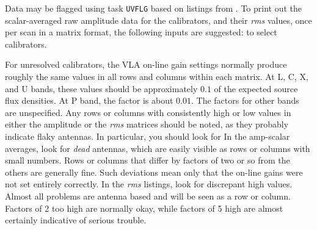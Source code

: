       Data may be flagged using task {\tt UVFLG} based on
listings from \hbox{{\tt {}}}.  To print out the
scalar-averaged raw amplitude data for the calibrators, and their {\it
rms\/} values, once per scan in a matrix format, the following inputs
are suggested:
 {to select calibrators.}

      For unresolved calibrators, the VLA on-line gain settings
normally produce roughly the same values in all rows and columns
within each matrix.  At L, C, X, and U bands, these values should be
approximately $0.1$ of the expected source flux densities.  At P band,
the factor is about $0.01$.  The factors for other bands are
unspecified.  Any rows or columns with consistently high or low values
in either the amplitude or the {\it rms\/}  matrices should be noted,
as they probably indicate flaky antennas.  In particular, you should
look for
\xbit
\Item In the amp-scalar averages, look for {\it dead\/} antennas,
     which are easily visible as rows or columns with small numbers.
     Rows or columns that differ by factors of two or so from the
     others are generally fine.  Such deviations mean only that the
     on-line gains were not set entirely correctly.
\Item In the {\it rms\/} listings, look for discrepant high values.
     Almost all problems are antenna based and will be seen as a row
     or column.  Factors of 2 too high are normally okay, while
     factors of 5 high are almost certainly indicative of serious
     trouble.
\xeit
{}

